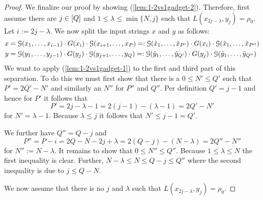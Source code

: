 \begin{proof}
We finalize our proof by showing (\ref{lem:1-2vs1gadget-2}).
Therefore, first assume there are $j \in [Q]$ and $1 \leq \lambda \leq \min\{N, j\}$ such that $L(x_{2j-\lambda}, y_j) = \rho_0$.
Let $i := 2j - \lambda$.
We now split the input strings $x$ and $y$ as follows:
\begin{align*}
x &= \lLCSGadget{x_1, \ldots, x_{i-1}} \cdot \gLargeLCS{x_i} \cdot \lLCSGadget{x_{i+1}, \ldots, x_P} %
=: \lLCSGadget{\hat{x}_1, \ldots, \hat{x}_{P'}} \cdot \gLargeLCS{x_i} \cdot \lLCSGadget{\tilde{x}_{1}, \ldots, \tilde{x}_{P''}}\\
y &= \lLCSGadget{y_1, \ldots, y_{j-1}} \cdot \gLargeLCS{y_j} \cdot \lLCSGadget{y_{j+1}, \ldots, y_Q} %
=: \lLCSGadget{\hat{y}_1, \ldots, \hat{y}_{Q'}} \cdot \gLargeLCS{y_j} \cdot \lLCSGadget{\tilde{y}_{1}, \ldots, \tilde{y}_{Q''}}
\end{align*}
We want to apply (\ref{lem:1-2vs1gadget-1}) to the first and third part of this separation.
To do this we must first show that there is a $0 \leq N' \leq Q'$ such that $P' = 2Q' - N'$ and similarly an $N''$ for $P''$ and $Q''$.
Per definition $Q' = j-1$ and hence for $P'$ it follows that 
\[
P' = 2j - \lambda - 1 = 2(j-1) - (\lambda - 1) = 2Q' - N'
\] 
for $N' = \lambda - 1$. Because $\lambda \leq j$ it follows that $N' \leq j - 1 = Q'$.

We further have $Q'' = Q - j$ and 
\[
P'' = P - i = 2Q - N - 2j + \lambda = 2(Q-j) - (N - \lambda) = 2Q'' - N''
\]
for $N'' := N - \lambda$.
It remains to show that $0 \leq N'' \leq Q''$.
Because $1 \leq \lambda \leq N$ the first inequality is clear.
Further, $N - \lambda \leq N \leq Q - j \leq Q''$ where the second inequality is due to $j \leq Q - N$.






We now assume that there is no $j$ and $\lambda$ such that $L(x_{2j-\lambda}, y_j) = \rho_0$.


\end{proof}


